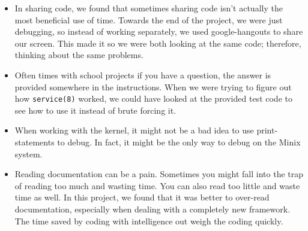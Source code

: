 \documentclass[11pt]{article}
\begin{document}
\begin{adjustwidth}{.2in}{}{

   \begin{itemize}

      \item In sharing code, we found that sometimes sharing code isn't actually the
         most beneficial use of time. Towards the end of the project, we were just
         debugging, so instead of working separately, we used google-hangouts to
         share our screen. This made it so we were both looking at the same code;
         therefore, thinking about the same problems.

      \item Often times with school projects if you have a question, the answer is
         provided somewhere in the instructions. When we were trying to figure out
         how {\tt service(8)} worked, we could have looked at the provided test
         code to see how to use it instead of brute forcing it.

      \item When working with the kernel, it might not be a bad idea to use
         print-statements to debug. In fact, it might be the only way to debug on the
         Minix system. 

      \item Reading documentation can be a pain. Sometimes you might fall into
         the trap of reading too much and wasting time. You can also read too
         little and waste time as well. In this project, we found that it was
         better to over-read documentation, especially when dealing with a
         completely new framework. The time saved by coding with intelligence out
         weigh the coding quickly.


   \end{itemize}

}\end{adjustwidth}
\end{document}
